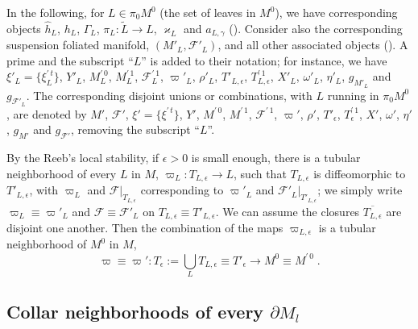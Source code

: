 \documentclass{memo-l}
\theoremstyle{plain}
\theoremstyle{definition}
\theoremstyle{remark}
\newcommand{\FF}{\mathcal{F}}
\numberwithin{section}{chapter}
\numberwithin{equation}{section}%
\begin{document}
In the following, for $L\in\pi_0M^0$ (the set of leaves in $M^0$), we have corresponding objects $\hat h_L$, $h_L$, $\Gamma_L$, $\pi_L:\widetilde L\to L$, $\varkappa_L$ and $a_{L,\gamma}$ (). Consider also the corresponding suspension foliated manifold, $(M'_L,\FF'_L)$, and all other associated objects (). A prime and the subscript ``$L$'' is added to their notation; for instance, we have $\xi'_L=\{\xi^{\prime\,t}_L\}$, $Y'_L$, $M^{\prime\,0}_L$, $M^{\prime\,1}_L$, $\FF^{\prime\,1}_L$, $\varpi'_L$, $\rho'_L$, $T'_{L,\epsilon}$, $T^{\prime\,1}_{L,\epsilon}$, $X'_L$, $\omega'_L$, $\eta'_L$, $g_{M'_L}$ and $g_{\FF'_L}$. The corresponding disjoint unions or combinations, with $L$ running in $\pi_0M^0$, are denoted by $M'$, $\FF'$, $\xi'=\{\xi^{\prime\,t}\}$, $Y'$, $M^{\prime\,0}$, $M^{\prime\,1}$, $\FF^{\prime\,1}$, $\varpi'$, $\rho'$, $T'_\epsilon$, $T^{\prime\,1}_\epsilon$, $X'$, $\omega'$, $\eta'$, $g_{M'}$ and $g_{\FF'}$, removing the subscript ``$L$''.

By the Reeb's local stability, if $\epsilon>0$ is small enough, there is a tubular neighborhood of every $L$ in $M$, $\varpi_L:T_{L,\epsilon}\to L$, such that $T_{L,\epsilon}$ is diffeomorphic to $T'_{L,\epsilon}$, with $\varpi_L$ and $\FF|_{T_{L,\epsilon}}$ corresponding to $\varpi'_L$ and $\FF'_L|_{T'_{L,\epsilon}}$; we simply write $\varpi_L\equiv\varpi'_L$ and $\FF\equiv\FF'_L$ on $T_{L,\epsilon}\equiv T'_{L,\epsilon}$. We can assume the closures $\overline{T_{L,\epsilon}}$ are disjoint one another. Then the combination of the maps $\varpi_{L,\epsilon}$ is a tubular neighborhood of $M^0$ in $M$,
\[
\varpi\equiv\varpi':T_\epsilon:=\bigcup_LT_{L,\epsilon}\equiv T'_\epsilon\to M^0\equiv M^{\prime\,0}\;.
\]


\subsection{Collar neighborhoods of every $\partial M_l$}\label{ss: collar neighborhoods of partial M_l}
\end{document}
